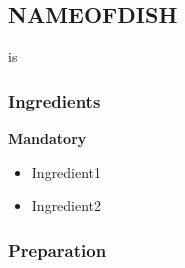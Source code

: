 \subsection{NAMEOFDISH}
 is 
\subsubsection{Ingredients}
\begin{minipage}[t]{0.5\textwidth}
{\bf Mandatory}
  \begin{itemize}
	  \item{Ingredient1}
	  \item{Ingredient2}
  \end{itemize}
\end{minipage}
\subsubsection{Preparation}
\vfill
